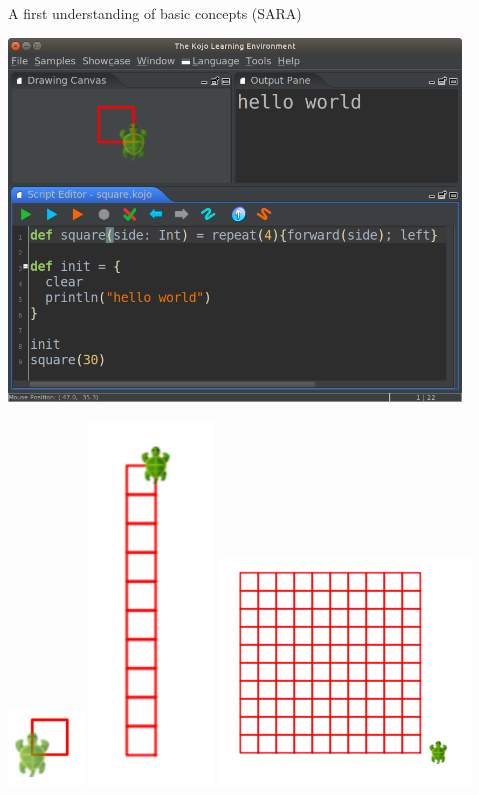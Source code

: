 \documentclass[aspectratio=169]{beamer}
\newenvironment{Slide}[1]%
  {\begin{frame}[environment=Slide]{#1}}
  {\end{frame}}%
\begin{document}
\begin{Slide}{A first understanding of basic concepts (SARA)}
\begin{minipage}{0.6\textwidth}
\includegraphics[width=0.9\textwidth]{Pictures/kojo-en}  
\end{minipage}%
\begin{minipage}{0.4\textwidth}
 \includegraphics[width=0.15\textwidth]{Pictures/square}%
 \includegraphics[width=0.25\textwidth]{Pictures/square-column}%
 \includegraphics[width=0.5\textwidth]{Pictures/square-grid}  \\

\end{minipage}
\end{Slide}
\end{document}
